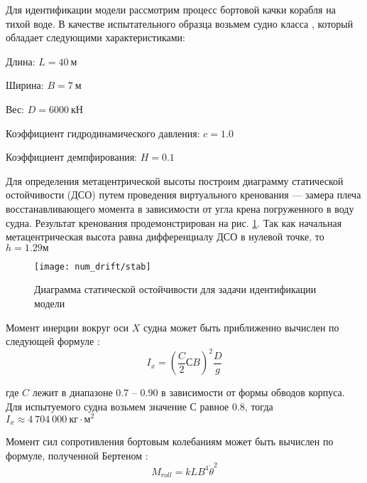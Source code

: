 Для идентификации модели рассмотрим процесс бортовой качки корабля на тихой воде.
В качестве испытательного образца возьмем судно класса , который обладает следующими характеристиками:

\begin{description}
	\item	Длина: $L = 40\ \text{м}$
	\item	Ширина: $B = 7\ \text{м}$
	\item	Вес: $D = 6 000\ \text{кН}$
	\item	Коэффициент гидродинамического давления: $c = 1.0$
	\item	Коэффициент демпфирования: $H = 0.1$
\end{description}

Для определения метацентрической высоты построим диаграмму статической остойчивости (ДСО) путем проведения виртуального кренования --- замера плеча восстанавливающего момента в зависимости от угла крена погруженного в воду судна. Результат кренования продемонстрирован на рис. \ref{drift:stab}. Так как начальная метацентрическая высота равна дифференциалу ДСО в нулевой точке, то $h=1.29 м$

\begin{figure}[h!]
\begin{center}
\texttt{[image: num\_drift/stab]}
\end{center}
\caption{Диаграмма статической остойчивости для задачи идентификации модели}
\label{drift:stab}
\end{figure}


Момент инерции вокруг оси $X$ судна может быть приближенно вычислен по следующей формуле \citep{hanovich47}:
\begin{equation}
	I_{x} = (\frac{C}{2}СB)^2 \frac{D}{g}
	\label{roll_torque}
\end{equation}


где $C$ лежит в диапазоне $0.7$ -- $0.90$ в зависимости от формы обводов корпуса. Для испытуемого судна возьмем значение $С$ равное $0.8$, тогда $I_x \approx 4\ 704\ 000\ \text{кг}\cdot \text{м}^2$

Момент сил сопротивления бортовым колебаниям может быть вычислен по формуле, полученной Бертеном \citep{hanovich47}:
\begin{equation}
	M_{roll} = kLB^4\dot{\theta}^2
	\label{roll_torque}
\end{equation}

